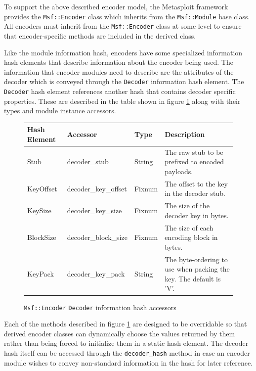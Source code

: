 \documentclass{report}
\begin{document}
\par
To support the above described encoder model, the Metasploit
framework provides the \texttt{Msf::Encoder} class which inherits
from the \texttt{Msf::Module} base class.  All encoders must inherit
from the \texttt{Msf::Encoder} class at some level to ensure that
encoder-specific methods are included in the derived class.

\par
Like the module information hash, encoders have some specialized
information hash elements that describe information about the
encoder being used.  The information that encoder modules need to
describe are the attributes of the decoder which is conveyed through
the \texttt{Decoder} information hash element.  The \texttt{Decoder}
hash element references another hash that contains decoder specific
properties.  These are described in the table shown in figure
\ref{fig-table-encoder-hash} along with their types and module
instance accessors.

\begin{figure}[h]
\begin{center}
\begin{tabular}{|l|l|l|p{2.0in}|}
\hline
\textbf{Hash Element} & \textbf{Accessor} & \textbf{Type} & \textbf{Description} \\
\hline
Stub & decoder\_stub & String & The raw stub to be prefixed to encoded payloads. \\
\hline
KeyOffset & decoder\_key\_offset & Fixnum & The offset to the key in the decoder stub. \\
\hline
KeySize & decoder\_key\_size & Fixnum & The size of the decoder key in bytes. \\
\hline
BlockSize & decoder\_block\_size & Fixnum & The size of each encoding block in bytes. \\
\hline
KeyPack & decoder\_key\_pack & String & The byte-ordering to use when packing the key.  The default is 'V'. \\
\hline
\end{tabular}
\caption{\texttt{Msf::Encoder} \texttt{Decoder} information hash
accessors} \label{fig-table-encoder-hash}
\end{center}
\end{figure}

\par
Each of the methods described in figure \ref{fig-table-encoder-hash}
are designed to be overridable so that derived encoder classes can
dynamically choose the values returned by them rather than being
forced to initialize them in a static hash element.  The decoder
hash itself can be accessed through the \texttt{decoder\_hash}
method in case an encoder module wishes to convey non-standard
information in the hash for later reference.
\end{document}
